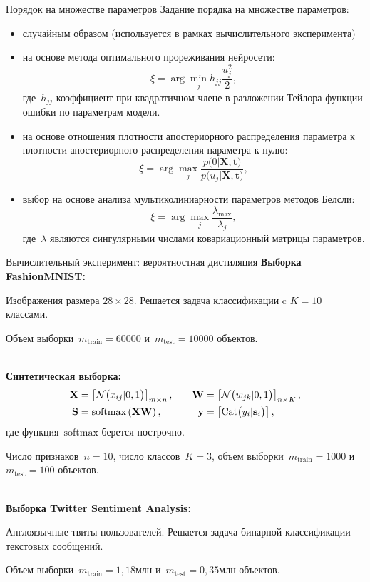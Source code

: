 \documentclass[10pt,pdf,hyperref={unicode}]{beamer}
\begin{document}
\begin{frame}{Порядок на множестве параметров}
Задание порядка на множестве параметров:
\begin{itemize}
	\item случайным образом (используется в рамках вычислительного эксперимента)
	\item на основе метода оптимального прореживания нейросети:
	\[
	\xi = \arg \min_{j} h_{jj}\frac{u_j^2}{2},
	\]
	где~$h_{jj}$ коэффициент при квадратичном члене в разложении Тейлора функции ошибки по параметрам модели.
	\item на основе отношения плотности апостериорного распределения параметра к плотности апостериорного распределения параметра к нулю:
	\[
	\xi = \arg \max_{j} \frac{p\bigr(0|\mathbf{X}, \mathbf{t}\bigr)}{p\bigr(u_j|\mathbf{X}, \mathbf{t}\bigr)},
	\]
	\item выбор на основе анализа мультиколиниарности параметров методов Белсли:
	\[
	\xi = \arg \max_{j} \frac{\lambda_{\max}}{\lambda_{j}}, 
	\]
	где~$\lambda$ являются сингулярными числами ковариационный матрицы параметров.
\end{itemize}
\end{frame}


\begin{frame}{Вычислительный эксперимент: вероятностная дистиляция}
\justifying
\textbf{Выборка FashionMNIST:}

Изображения размера $28\times 28$. Решается задача классификации c $K=10$ классами.

Объем выборки~$m_{\text{train}}=60000$ и~$m_{\text{test}}=10000$ объектов.

~\\
\textbf{Синтетическая выборка:}
\[
\setlength\abovedisplayskip{0pt}
\begin{aligned}
\mathbf{X} &= \left[\mathcal{N}\bigr(x_{ij}|0, 1\bigr)\right]_{m\times n},  \quad &\mathbf{W} &= \left[\mathcal{N}\bigr(w_{jk}|0, 1\bigr)\right]_{n\times K}, \\
 \mathbf{S} &= \text{softmax}\left(\mathbf{XW}\right), \quad &\mathbf{y} &= \left[\text{Cat}\bigr(y_i| \mathbf{s}_i\bigr)\right],
\end{aligned}
\setlength\belowdisplayskip{0pt}
\]
где функция~$\text{softmax}$ берется построчно.

Число признаков~$n=10$, число классов~$K=3$, объем выборки~$m_{\text{train}}=1000$ и~$m_{\text{test}}=100$ объектов. 

~\\
\textbf{Выборка Twitter Sentiment Analysis:}

Англоязычные твиты пользователей. Решается задача бинарной классификации текстовых сообщений.

Объем выборки~$m_{\text{train}}=1{,}18$млн и~$m_{\text{test}}=0{,}35$млн объектов.

\end{frame}
\end{document}
